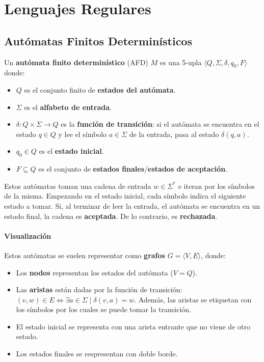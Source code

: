 \chapter{Lenguajes Regulares}

\section{Autómatas Finitos Determinísticos}
\label{definicion-afds}

Un \textbf{autómata finito determinístico} (AFD) $M$ es una 5-upla $\langle Q, \Sigma, \delta, q_0, F \rangle$ donde:
\begin{itemize}
    \item $Q$ es el conjunto finito de \textbf{estados del autómata}.
    \item $\Sigma$ es el \textbf{alfabeto de entrada}.
    \item $\delta: Q \times \Sigma \to Q$ es la \textbf{función de transición}: si el autómata se encuentra en el estado $q \in Q$ y lee el símbolo $a \in \Sigma$ de la entrada, pasa al estado $\delta(q, a)$.
    \item $q_0 \in Q$ es el \textbf{estado inicial}.
    \item $F \subseteq Q$ es el conjunto de \textbf{estados finales}/\textbf{estados de aceptación}.
\end{itemize}


Estos autómatas toman una cadena de entrada $w \in \Sigma^*$ e iteran por los símbolos de la misma. Empezando en el estado inicial, cada símbolo indica el siguiente estado a tomar. Si, al terminar de leer la entrada, el autómata se encuentra en un estado final, la cadena es \textbf{aceptada}. De lo contrario, es \textbf{rechazada}.

\subsubsection{Visualización}

Estos autómatas se suelen representar como \textbf{grafos} $G = \langle V, E \rangle$, donde:
\begin{itemize}
    \item Los \textbf{nodos} representan los estados del autómata ($V = Q$).
    \item Las \textbf{aristas} están dadas por la función de transición: $(v, w) \in E \iff \exists a \in \Sigma \mid \delta(v, a) = w$. Además, las aristas se etiquetan con los símbolos por los cuales se puede tomar la transición.
    \item El estado inicial se representa con una arista entrante que no viene de otro estado.
    \item Los estados finales se respresentan con doble borde.
\end{itemize}

